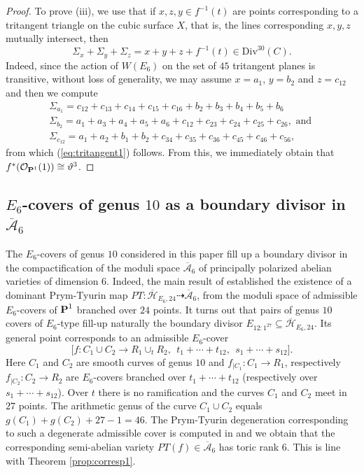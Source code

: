 \documentclass[11pt]{amsart}
\theoremstyle{definition}
\def\PP{{\textbf P}}
\def\OO{\mathcal{O}}
\def\cA{\mathcal{A}}
\def\cH{\mathcal{H}}
\begin{document}
\begin{proof}
\vskip 4pt

To prove (iii), we use that if $x,z,y\in f^{-1}(t)$ are points corresponding to a tritangent triangle on the cubic surface $X$, that is, the lines corresponding $x,y,z$ mutually intersect, then  
\begin{equation}\label{eq:tritangent1}
\Sigma_x+\Sigma_y+\Sigma_z=x+y+z+f^{-1}(t)\in \mbox{Div}^{30}(C).
\end{equation}
Indeed, since the action of $W(E_6)$ on the set of $45$ tritangent planes is transitive, without loss of generality, we may assume $x=a_1$, $y=b_2$ and $z=c_{12}$ and then we compute 
\begin{align*}
    \Sigma_{a_1}=c_{12}+c_{13}+c_{14}+c_{15}+c_{16}+b_2+b_3+b_4+b_5+b_6\\
    \Sigma_{b_2}=a_1+a_3+a_4+a_5+a_6+c_{12}+c_{23}+c_{24}+c_{25}+c_{26}, \mbox{ and }\\
    \Sigma_{c_{12}}=a_1+a_2+b_1+b_2+c_{34}+c_{35}+c_{36}+c_{45}+c_{46}+c_{56},
\end{align*}
from which (\ref{eq:tritangent1}) follows. From this, we immediately obtain that $f^*(\OO_{\PP^1}(1))\cong \vartheta^{3}$.
\end{proof}

\subsection{$E_6$-covers of genus $10$ as a boundary divisor in $\overline{\cA}_6$}\label{subsect_a6}

The $E_6$-covers of genus $10$ considered in this paper fill up a boundary divisor in the compactification of the moduli space $\overline{\cA}_6$ of principally polarized abelian varieties of dimension $6$. Indeed, the main result of \cite{ADFIO} established the existence of a dominant Prym-Tyurin map $PT\colon \overline{\cH}_{E_6, 24}\dashrightarrow \overline{\cA}_6$, from the moduli space of admissible $E_6$-covers of $\PP^1$ branched over $24$ points. It turns out that pairs of  genus $10$ covers of $E_6$-type fill-up naturally the boundary divisor $E_{12:1^{27}}\subseteq \overline{\cH}_{E_6, 24}$. Its general point corresponds to an admissible $E_6$-cover
$$\bigl[ f\colon C_1\cup C_2\longrightarrow R_1\cup_t R_2, \  \ t_1+\cdots+t_{12}, \ \  s_1+\cdots+s_{12}\bigr].$$
Here $C_1$ and $C_2$ are smooth curves of genus $10$ and $f_{|C_1}\colon C_1\rightarrow R_1$, respectively $f_{|C_2}\colon C_2\rightarrow R_2$ are $E_6$-covers branched over $t_1+\cdots+t_{12}$ (respectively over $s_1+\cdots+s_{12}$). Over $t$ there is no ramification and the curves $C_1$ and $C_2$ meet in $27$ points. The arithmetic genus of the curve $C_1\cup C_2$ equals $g(C_1)+g(C_2)+27-1=46$. The Prym-Tyurin degeneration corresponding to such a degenerate admissible cover is computed in \cite[Corollary 7.5]{ADFIO} and we obtain that the corresponding semi-abelian variety $PT(f)\in \overline{\cA}_6$ has toric rank $6$. This is line with Theorem \ref{prop:corresp1}.
\end{document}
